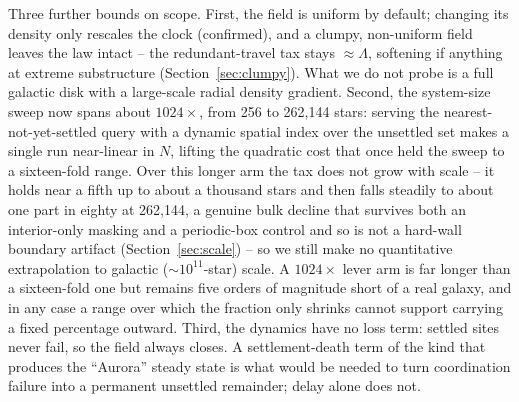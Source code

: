 Three further bounds on scope. First, the field is uniform by default; changing its density only
rescales the clock (confirmed), and a clumpy, non-uniform field leaves the law intact -- the
redundant-travel tax stays $\approx \Lambda$, softening if anything at extreme substructure
(Section~\ref{sec:clumpy}). What we do not probe is a full galactic disk with a large-scale radial
density gradient. Second, the system-size sweep now spans about $1024\times$, from 256 to 262{,}144
stars: serving the nearest-not-yet-settled query with a dynamic spatial index over the unsettled set
makes a single run near-linear in $N$, lifting the quadratic cost that once held the sweep to a
sixteen-fold range. Over this longer arm the tax does not grow with scale -- it holds near a fifth up
to about a thousand stars and then falls steadily to about one part in eighty at 262{,}144, a
genuine bulk decline that survives both an interior-only masking and a periodic-box control and so is
not a hard-wall boundary artifact (Section~\ref{sec:scale}) -- so we still make no quantitative
extrapolation to galactic ($\sim\!10^{11}$-star) scale. A $1024\times$ lever arm is far longer than a
sixteen-fold one but remains five orders of magnitude short of a real galaxy, and in any case a range
over which the fraction only shrinks cannot support carrying a fixed percentage outward. Third, the
dynamics have no loss term: settled sites never fail, so the field always closes. A
settlement-death term of the kind that produces the ``Aurora'' steady state
\citep{carroll-nellenback-2019} is what would be needed to turn coordination failure into a
permanent unsettled remainder; delay alone does not.

